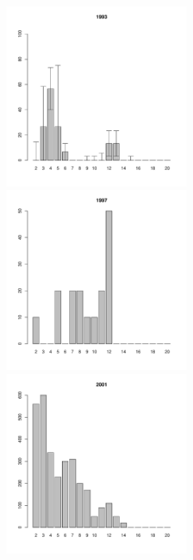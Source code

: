 \begin{figure}[hp]
\begin{minipage}[b]{.3\linewidth}
\begin{center}
	\end{center}
	\end{minipage}
	\begin{minipage}[b]{.3\linewidth}
	\begin{center}
	\includegraphics[width=60mm]{../White_Sea/Luvenga_Goreliy/high2_1993_.pdf}
	\end{center}
	\end{minipage}
	\hfil %
	\begin{minipage}[b]{.3\linewidth}
	\begin{center}
	\includegraphics[width=60mm]{../White_Sea/Luvenga_Goreliy/high2_1997_.pdf}
	\end{center}
	\end{minipage}
	\hfil %
	\begin{minipage}[b]{.3\linewidth}
	\begin{center}
	\includegraphics[width=60mm]{../White_Sea/Luvenga_Goreliy/high2_2001_.pdf}
	\end{center}
	\end{minipage}



\end{figure}
